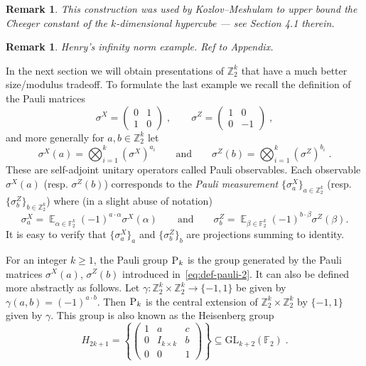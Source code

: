 \documentclass[11pt]{article}
\newtheorem{remark}[theorem]{Remark}
\theoremstyle{definition}
\DeclareMathOperator*{\Expectation}{\mathbb{E}}
\newcommand{\Es}[1]{\Expectation_{#1}}
\newcommand{\F}{\ensuremath{\mathbb{F}}}
\newcommand{\Z}{\ensuremath{\mathbb{Z}}}
\newcommand{\gamestyle}[1]{\ensuremath{\textsc{#1}}\xspace}
\newcommand{\pauli}{\gamestyle{P}}
\begin{document}
\begin{remark}
    This construction was used by Kozlov--Meshulam \cite{kozlov2019quantitative} to upper bound the Cheeger constant of the $k$-dimensional hypercube --- see Section 4.1 therein.
\end{remark}

\begin{remark}
Henry's infinity norm example. Ref to Appendix.    
\end{remark}

In the next section we will obtain presentations of $\Z_2^k$ that have a much better size/modulus tradeoff.
To formulate the last example we recall the definition of the Pauli matrices
	\begin{equation}\label{eq:def-pauli-1} \sigma^X = \begin{pmatrix} 0 & 1 \\ 1 & 0 \end{pmatrix}\;,\qquad \sigma^Z = \begin{pmatrix} 1 & 0 \\ 0 & -1\end{pmatrix}\;,
	\end{equation}
	and more generally for $a,b\in \Z_2^k$ let 
	\begin{equation}\label{eq:def-pauli-2}
	\sigma^X(a) = \bigotimes_{i=1}^k (\sigma^X)^{a_i}\qquad\text{and}\qquad\sigma^Z(b) = \bigotimes_{i=1}^k (\sigma^Z)^{b_i}\;.
	\end{equation}
These are self-adjoint unitary operators called Pauli observables. Each observable $\sigma^X(a)$ (resp. $\sigma^Z(b)$) corresponds to the \emph{Pauli measurement} $\{ \sigma^X_a \}_{a \in \Z_2^k}$ (resp. $\{ \sigma^Z_b \}_{b \in \Z_2^k}$) where (in a slight abuse of notation)  
	\[ \sigma^X_a = \Es{\alpha\in\F_2^k} (-1)^{a\cdot \alpha} \sigma^X(\alpha)\qquad\text{and}\qquad\sigma^Z_b = \Es{\beta\in\F_2^k} (-1)^{b\cdot\beta} \sigma^Z(\beta).\]
	It is easy to verify that $\{\sigma^X_a\}_a$ and $\{\sigma^Z_b\}_b$ are projections summing to identity.	
	
For an integer $k\geq 1$,  the Pauli group $\pauli_k$ is the group generated by the Pauli matrices $\sigma^X(a)$, $\sigma^Z(b)$ introduced in~\eqref{eq:def-pauli-2}. It can also be defined more abstractly as follows. Let $\gamma: \Z_2^k\times \Z_2^k \to \{-1,1\}$ be given by $\gamma(a,b)=(-1)^{a\cdot b}$. Then $\pauli_k$ is the central extension of $\Z_2^k\times \Z_2^k$ by $\{-1,1\}$ given by $\gamma$. This group 
is also known as the Heisenberg group 
\[ H_{2k+1} = \left \{ \begin{pmatrix} 1 & a & c \\ 0 & I_{k \times k} & b \\ 0 & 0 & 1 \end{pmatrix} \right\}\subseteq {\mathrm{GL}}_{k+2}(\F_2)\;.\]
 
\end{document}
